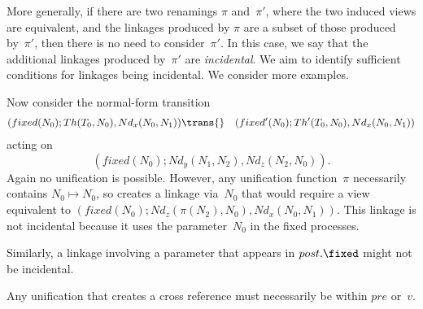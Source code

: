 

More generally, if there are two renamings $\pi$ and~$\pi'$, where the two
induced views are equivalent, and the linkages produced by $\pi$ are a subset
of those produced by~$\pi'$, then there is no need to consider~$\pi'$.  In
this case, we say that the additional linkages produced by~$\pi'$ are
\emph{incidental}.  We aim to identify sufficient conditions for linkages
being incidental.  We consider more examples.


\begin{example}\label{example:30}
Now consider the normal-form transition
\begin{eqnarray*}
(fixed(N_0); Th(T_0,N_0), Nd_x(N_0,N_1)) & \trans{} &
  (fixed'(N_0); Th'(T_0,N_0), Nd_x(N_0,N_1))
\end{eqnarray*}
acting on 
\[
(fixed(N_0); Nd_y(N_1,N_2), Nd_z(N_2,N_0)).
\]
Again no unification is possible.  However, any unification function~$\pi$
necessarily contains $N_0 \mapsto N_0$, so creates a linkage via~$N_0$ that
would require a view equivalent to $(fixed(N_0); Nd_z(\pi(N_2),N_0),
Nd_x(N_0,N_1))$.  This linkage is not incidental because it uses the
parameter~$N_0$ in the fixed processes.
\end{example}


Similarly, a linkage involving a parameter that appears in $post.\fixed$ might
not be incidental.  
%

\framebox{***} Any unification that creates a cross reference must necessarily
be within $pre$ or~$v$.



